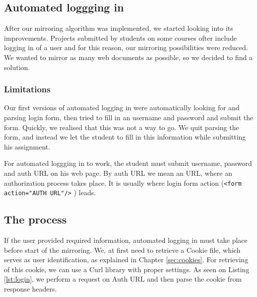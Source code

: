 
\subsection{Automated loggging in}
\label{sec:login}
After our mirroring algorithm was implemented, we started looking into its improvements. Projects submitted by students on some courses ofter include logging in of a user and for this reason, our mirroring possibilities were reduced. We wanted to mirror as many web documents as possible, so we decided to find a solution.

\subsubsection{Limitations}
Our first versions of automated logging in were automatically looking for and parsing login form, then tried to fill in an username and password and submit the form. Quickly, we realised that this was not a way to go. We quit parsing the form, and instead we let the student to fill in this information while submitting his assignment.

For automated loggging in to work, the student must submit username, password and auth URL on his web page. By auth URL we mean an URL, where an authorization process takes place. It is usually where login form action (\texttt{<form action="AUTH URL"/>} ) leads.

\subsection{The process}
If the user provided required information, automated logging in must take place before start of the mirroring. We, at first need to retrieve a Cookie file, which serves as user identification, as explained in Chapter \ref{sec:cookies}. For retrieving of this cookie, we can use a Curl library with proper settings. As seen on Listing \ref{lst:login}, we perform a request on Auth URL and then parse the cookie from response headers.

